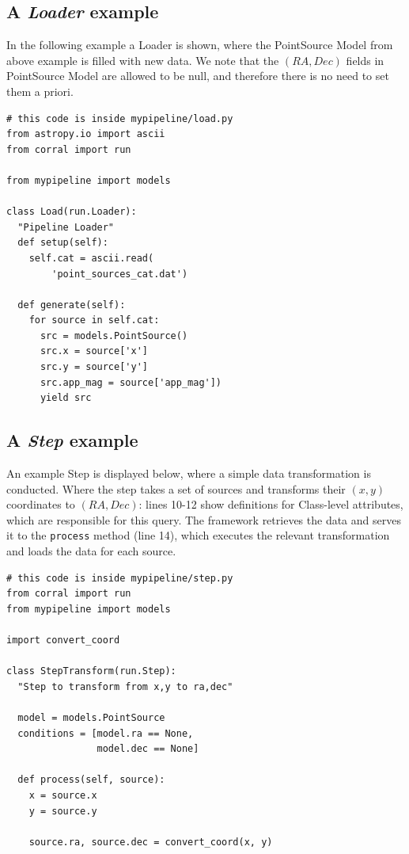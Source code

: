 \documentclass[final,5p,times,twocolumn,authoryear]{elsarticle}
\begin{document}
\subsection{A \textit{Loader} example}
In the following example a Loader is shown, where the PointSource
Model from above example is filled with new data. We note that the $(RA, Dec)$ fields in PointSource Model are allowed to be null, and therefore there is no need to set them a priori.
%
\begin{verbatim}
# this code is inside mypipeline/load.py
from astropy.io import ascii
from corral import run

from mypipeline import models

class Load(run.Loader):
  "Pipeline Loader"
  def setup(self):
    self.cat = ascii.read(
        'point_sources_cat.dat')

  def generate(self):
    for source in self.cat:
      src = models.PointSource()
      src.x = source['x']
      src.y = source['y']
      src.app_mag = source['app_mag'])
      yield src
\end{verbatim}
%
\subsection{A \textit{Step} example}
An example Step is displayed below, where a simple data transformation
is conducted.
%
Where the step takes a set of sources and transforms their $(x,y)$ coordinates to $(RA, Dec)$:
lines 10-12 show definitions for Class-level attributes,
which are responsible for this query. The framework retrieves the data
and serves it to the \texttt{process} method (line 14), which
executes the relevant transformation and loads the data for each
source.
%
%
\begin{verbatim}
# this code is inside mypipeline/step.py
from corral import run
from mypipeline import models

import convert_coord

class StepTransform(run.Step):
  "Step to transform from x,y to ra,dec"

  model = models.PointSource
  conditions = [model.ra == None,
                model.dec == None]

  def process(self, source):
    x = source.x
    y = source.y

    source.ra, source.dec = convert_coord(x, y)
\end{verbatim}
%
%
\end{document}
